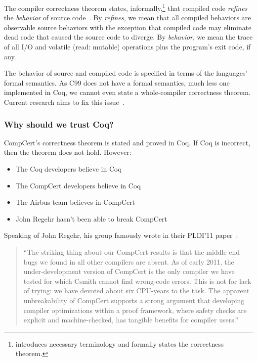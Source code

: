 The compiler correctness theorem states, informally,\footnote{ introduces necessary terminology and  formally states the correctness theorem.}
 that compiled code \emph{refines} the \emph{behavior} of source code~\cite{refman}.
By \emph{refines}, we mean that all compiled behaviors are observable source behaviors with the exception that compiled code may eliminate dead code that caused the source code to diverge.
By \emph{behavior}, we mean the trace of all I/O and volatile (read: mutable) operations plus the program's exit code, if any.

The behavior of source and compiled code is specified in terms of the languages' formal semantics.
As C99 does not have a formal semantics, much less one implemented in Coq, we cannot even state a whole-compiler correctness theorem.
Current research aims to fix this issue~\cite{k-standard,klw-formal}.


\subsubsection{Why should we trust Coq?}

CompCert's correctness theorem is stated and proved in Coq.
If Coq is incorrect, then the theorem does not hold.
However:
\begin{itemize}
\item The Coq developers believe in Coq
\item The CompCert developers believe in Coq
\item The Airbus team believes in CompCert
\item John Regehr hasn't been able to break CompCert
\end{itemize}


Speaking of John Regehr, his group famously wrote in their PLDI'11 paper~\cite{ycer-finding}:
\begin{quote}
  ``The striking thing about our CompCert results is that the middle end bugs we found in all other compilers are absent.
  As of early 2011, the under-development version of CompCert is the only compiler we have tested for which Csmith cannot find wrong-code errors.
  This is not for lack of trying: we have devoted about six CPU-years to the task.
  The apparent unbreakability of CompCert supports a strong argument that developing compiler optimizations within a proof framework, where safety checks are explicit and machine-checked, has tangible benefits for compiler users.''
\end{quote}

